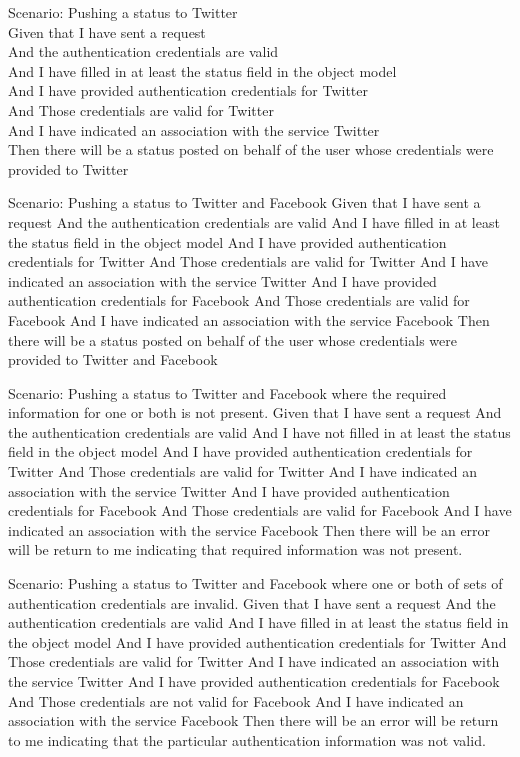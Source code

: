 \documentclass[12pt]{article}
\begin{document}
Scenario: Pushing a status to Twitter \\
	Given that I have sent a request \\
	And the authentication credentials are valid \\
	And I have filled in at least the status field in the object model \\
	And I have provided authentication credentials for Twitter \\ 
	And Those credentials are valid for Twitter \\ 
	And I have indicated an association with the service Twitter \\
	Then there will be a status posted on behalf of the user whose credentials 
	were provided to Twitter

Scenario: Pushing a status to Twitter and Facebook
	Given that I have sent a request
	And the authentication credentials are valid
	And I have filled in at least the status field in the object model
	And I have provided authentication credentials for Twitter
	And Those credentials are valid for Twitter
	And I have indicated an association with the service Twitter
	And I have provided authentication credentials for Facebook
	And Those credentials are valid for Facebook
	And I have indicated an association with the service Facebook
	Then there will be a status posted on behalf of the user whose credentials 
	were provided to Twitter and Facebook

Scenario: Pushing a status to Twitter and Facebook where the required 
information for one or both is not present.
	Given that I have sent a request
	And the authentication credentials are valid
	And I have not filled in at least the status field in the object model
	And I have provided authentication credentials for Twitter
	And Those credentials are valid for Twitter
	And I have indicated an association with the service Twitter
	And I have provided authentication credentials for Facebook
	And Those credentials are valid for Facebook
	And I have indicated an association with the service Facebook
	Then there will be an error will be return to me indicating that required 
	information was not present.

Scenario: Pushing a status to Twitter and Facebook where one or both of sets of 
authentication credentials are invalid.
	Given that I have sent a request
	And the authentication credentials are valid
	And I have filled in at least the status field in the object model
	And I have provided authentication credentials for Twitter
	And Those credentials are valid for Twitter
	And I have indicated an association with the service Twitter
	And I have provided authentication credentials for Facebook
	And Those credentials are not valid for Facebook
	And I have indicated an association with the service Facebook
	Then there will be an error will be return to me indicating that the 
	particular authentication information was not valid. 
\end{document}
